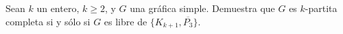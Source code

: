 Sean $k$ un entero, $k \ge 2$, y $G$ una gráfica simple. Demuestra que $G$
es $k$-partita completa si y sólo si $G$ es libre de $\{K_{k+1},
\overline{P_3}\}$.